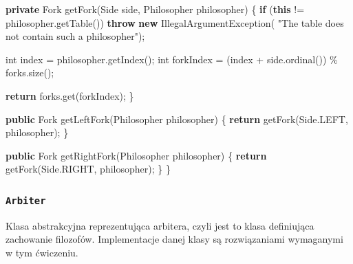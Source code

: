 \documentclass[11pt]{article}
\newenvironment{Shaded}{}{}
\newcommand{\KeywordTok}[1]{\textcolor[rgb]{0.00,0.44,0.13}{\textbf{{#1}}}}
\newcommand{\DataTypeTok}[1]{\textcolor[rgb]{0.56,0.13,0.00}{{#1}}}
\newcommand{\StringTok}[1]{\textcolor[rgb]{0.25,0.44,0.63}{{#1}}}
\newcommand{\FunctionTok}[1]{\textcolor[rgb]{0.02,0.16,0.49}{{#1}}}
\newcommand{\NormalTok}[1]{{#1}}
\newcommand{\ControlFlowTok}[1]{\textcolor[rgb]{0.00,0.44,0.13}{\textbf{{#1}}}}
\newcommand{\OperatorTok}[1]{\textcolor[rgb]{0.40,0.40,0.40}{{#1}}}
\newcommand{\BuiltInTok}[1]{{#1}}
\begin{document}
\begin{Shaded}
\begin{Highlighting}[]
    \KeywordTok{private}\NormalTok{ Fork }\FunctionTok{getFork}\OperatorTok{(}\NormalTok{Side side}\OperatorTok{,}\NormalTok{ Philosopher philosopher}\OperatorTok{)} \OperatorTok{\{}
        \ControlFlowTok{if} \OperatorTok{(}\KeywordTok{this} \OperatorTok{!=}\NormalTok{ philosopher}\OperatorTok{.}\FunctionTok{getTable}\OperatorTok{())}
            \ControlFlowTok{throw} \KeywordTok{new} \BuiltInTok{IllegalArgumentException}\OperatorTok{(}
                \StringTok{"The table does not contain such a philosopher"}\OperatorTok{);}

        \DataTypeTok{int}\NormalTok{ index }\OperatorTok{=}\NormalTok{ philosopher}\OperatorTok{.}\FunctionTok{getIndex}\OperatorTok{();}
        \DataTypeTok{int}\NormalTok{ forkIndex }\OperatorTok{=} \OperatorTok{(}\NormalTok{index }\OperatorTok{+}\NormalTok{ side}\OperatorTok{.}\FunctionTok{ordinal}\OperatorTok{())} \OperatorTok{\%}\NormalTok{ forks}\OperatorTok{.}\FunctionTok{size}\OperatorTok{();}

        \ControlFlowTok{return}\NormalTok{ forks}\OperatorTok{.}\FunctionTok{get}\OperatorTok{(}\NormalTok{forkIndex}\OperatorTok{);}
    \OperatorTok{\}}

    \KeywordTok{public}\NormalTok{ Fork }\FunctionTok{getLeftFork}\OperatorTok{(}\NormalTok{Philosopher philosopher}\OperatorTok{)} \OperatorTok{\{}
        \ControlFlowTok{return} \FunctionTok{getFork}\OperatorTok{(}\NormalTok{Side}\OperatorTok{.}\FunctionTok{LEFT}\OperatorTok{,}\NormalTok{ philosopher}\OperatorTok{);}
    \OperatorTok{\}}

    \KeywordTok{public}\NormalTok{ Fork }\FunctionTok{getRightFork}\OperatorTok{(}\NormalTok{Philosopher philosopher}\OperatorTok{)} \OperatorTok{\{}
        \ControlFlowTok{return} \FunctionTok{getFork}\OperatorTok{(}\NormalTok{Side}\OperatorTok{.}\FunctionTok{RIGHT}\OperatorTok{,}\NormalTok{ philosopher}\OperatorTok{);}
    \OperatorTok{\}}
\OperatorTok{\}}
\end{Highlighting}
\end{Shaded}

    \hypertarget{arbiter}{%
\subsubsection{\texorpdfstring{\texttt{Arbiter}}{Arbiter}}\label{arbiter}}

Klasa abstrakcyjna reprezentująca arbitera, czyli jest to klasa
definiująca zachowanie filozofów. Implementacje danej klasy są
rozwiązaniami wymaganymi w tym ćwiczeniu.
\end{document}
